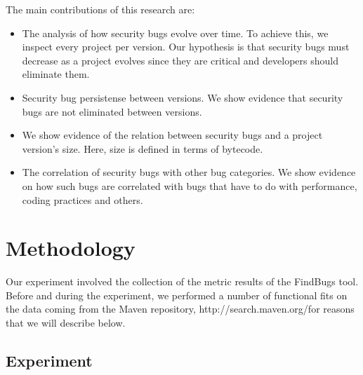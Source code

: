 \documentclass[conference]{llncs}
\begin{document}
The main contributions of this research are:
\begin{itemize}
	\item The analysis of how security bugs evolve over time. To achieve
this, we inspect every project per version. Our hypothesis is that security
bugs must decrease as a project evolves since they are critical and developers
should eliminate them.
	\item Security bug persistense between versions. We show evidence that
security bugs are not eliminated between versions.
	\item We show evidence of the relation between security bugs and a project
version's size.  Here, size is defined in terms of bytecode.
	\item The correlation of security bugs with other bug categories. We
show evidence on how such bugs are correlated with bugs that have to do with
performance, coding practices and others.
\end{itemize}


\section{Methodology}
\label{sec:meth}


Our experiment involved the collection of the metric results of the FindBugs
tool. Before and during the experiment, we performed a number of functional
fits on the data coming from the Maven repository,
http://search.maven.org/for reasons that we will describe below.

\subsection{Experiment}
\label{sec:exp}
\end{document}

